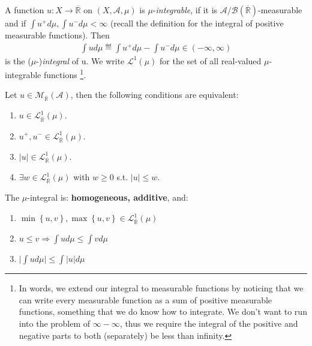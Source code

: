 \begin{definition}
    A function \(u:X \rightarrow \overline{\mathbb{R}}\) on \((X, \mathscr{A}, \mu)\) is \(\mu\)-\emph{integrable}, if it is 
    \(\mathscr{A}/\mathscr{B}(\overline{\mathbb{R}})\)-measurable and if \(\int u^+ d\mu, \int u^-d\mu < \infty\) (recall the definition
    for the integral of positive measurable functions). Then
    \begin{align*}
        \int ud\mu \eqdef \int u^+d\mu - \int u^-d\mu \in (-\infty, \infty)
    \end{align*}
    is the (\(\mu\)-)\emph{integral} of u. We write \(\mathcal{L}^1(\mu)\) for the set of all real-valued \(\mu\)-integrable functions
    \footnote{In words, we extend our integral to  measurable functions by noticing that we can write every measurable 
    function as a sum of positive measurable functions, something that we do know how to integrate. We don't want to run into the problem
    of \(\infty - \infty\), thus we require the integral of the positive and negative parts to both (separately) be less than infinity.}.
\end{definition}
\begin{theorem}
    Let \(u\in \mathcal{M}_{\overline{\mathbb{R}}}(\mathscr{A})\), then the following conditions are equivalent:
    \begin{enumerate}[label=(\roman*)]
        \item \(u \in \mathcal{L}^{1}_{\overline{\mathbb{R}}}(\mu)\).
        \item \(u^+, u^- \in \mathcal{L}^{1}_{\overline{\mathbb{R}}}(\mu)\).
        \item \(\vert u\vert \in \mathcal{L}^{1}_{\overline{\mathbb{R}}}(\mu)\).
        \item \(\exists w \in \mathcal{L}^{1}_{\overline{\mathbb{R}}}(\mu)\) with \(w\geq 0\) s.t. \(\vert u \vert \leq w\).
    \end{enumerate}
\end{theorem}
\begin{theorem} The \(\mu\)-integral is: \textbf{homogeneous, additive}, and:
    \begin{enumerate}[label=(\roman*)]
        \item \(\min\left\{u,v\right\}, \max\left\{u,v\right\} \in \mathcal{L}^{1}_{\overline{\mathbb{R}}}(\mu)\) 
        \item \(u\leq v \Rightarrow \int ud\mu \leq \int vd\mu\) 
        \item \(\Big\vert \int ud\mu \Big\vert \leq \int \vert u\vert d\mu\) 
    \end{enumerate}
\end{theorem}
